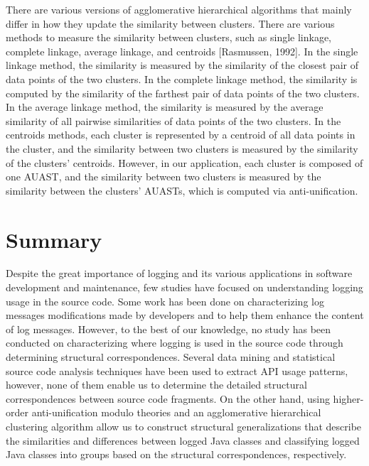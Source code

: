 There are various versions of agglomerative hierarchical algorithms that mainly differ in how they update the similarity between clusters. There are various methods to measure the similarity between clusters, such as single linkage, complete linkage, average linkage, and centroids [Rasmussen, 1992]. In the single linkage method, the similarity is measured by the similarity of the closest pair of data points of the two clusters. In the complete linkage method, the similarity is computed by the similarity of the farthest pair of data points of the two clusters. In the average linkage method, the similarity is measured by the average similarity of all pairwise similarities of data points of the two clusters. In the centroids methods, each cluster is represented by a centroid of all data points in the cluster, and the similarity between two clusters is measured by the similarity of the clusters’ centroids.
However, in our application, each cluster is composed of one AUAST, and the similarity between two clusters is measured by the similarity between the clusters’ AUASTs, which is computed via anti-unification.

\section{Summary}  \label{back-summary}

Despite the great importance of logging and its various applications in software development and maintenance, few studies have focused on understanding logging usage in the source code. 
Some work has been done on characterizing log messages modifications made by developers and to help them enhance the content of log messages. However, to the best of our knowledge, no study has been conducted on characterizing where logging is used in the source code through determining structural correspondences. Several data mining and statistical source code analysis techniques have been used to extract API usage patterns, however, none of them enable us to determine the detailed structural correspondences between source code fragments. On the other hand, using higher-order anti-unification modulo theories and an agglomerative hierarchical clustering algorithm allow us to construct structural generalizations that describe the similarities and differences between logged Java classes and classifying logged Java classes into groups based on the structural correspondences, respectively.

